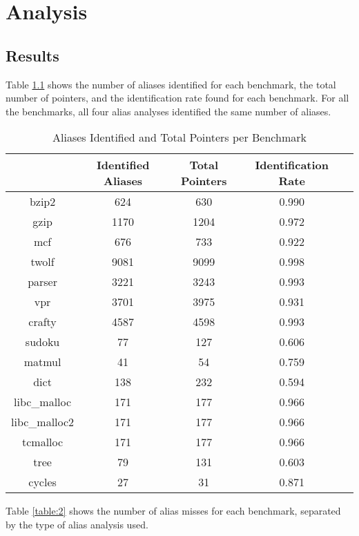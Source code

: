 \chapter{Analysis}

\section{Results}
Table \ref{table:1} shows the number of aliases identified for each benchmark, the total number of pointers, and the identification rate found for each benchmark. For all the benchmarks, all four alias analyses identified the same number of aliases.

\begin{table} [h!]
\centering
   \begin{tabular} {|c|c c c c|}
      \hline
	   & Identified Aliases & Total Pointers & Identification Rate \\
      \hline
	   bzip2 & 624 & 630 & 0.990 \\
      \hline
	   gzip & 1170 & 1204 & 0.972 \\
      \hline
	   mcf & 676 & 733 & 0.922 \\
      \hline
	   twolf & 9081 & 9099 & 0.998 \\
      \hline
	   parser & 3221 & 3243 & 0.993 \\
      \hline
	   vpr & 3701 & 3975 & 0.931 \\
      \hline
	   crafty & 4587 & 4598 & 0.993 \\
      \hline
	   sudoku & 77 & 127 & 0.606 \\
      \hline
	   matmul & 41 & 54 & 0.759 \\
      \hline
	   dict & 138 & 232 & 0.594 \\
      \hline
	   libc\_malloc & 171 & 177 & 0.966 \\
      \hline
	   libc\_malloc2 & 171 & 177 & 0.966 \\
      \hline
	   tcmalloc & 171 & 177 & 0.966 \\
      \hline
	   tree & 79 & 131 & 0.603 \\
      \hline
	   cycles & 27 & 31 & 0.871 \\
      \hline
   \end{tabular}
   \caption{Aliases Identified and Total Pointers per Benchmark}
   \label{table:1}
\end{table}

\newpage

Table \ref{table:2} shows the number of alias misses for each benchmark, separated by the type of alias analysis used.

